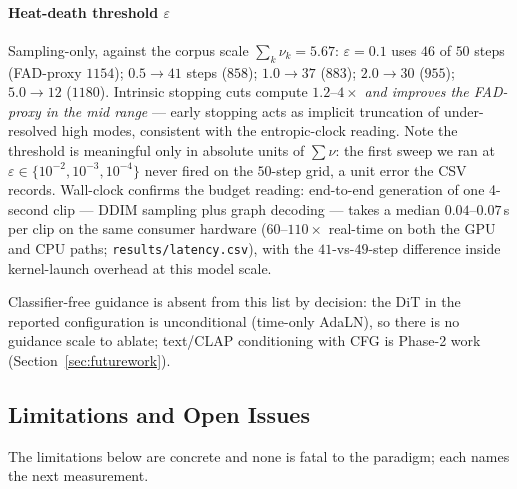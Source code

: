 \documentclass[12pt,a4paper]{article}
\begin{document}
\paragraph{Heat-death threshold $\varepsilon$}
Sampling-only, against the corpus scale $\sum_k \nu_k = 5.67$:
$\varepsilon = 0.1$ uses $46$ of $50$ steps (FAD-proxy $1154$);
$0.5 \to 41$ steps ($858$); $1.0 \to 37$ ($883$); $2.0 \to 30$ ($955$);
$5.0 \to 12$ ($1180$). Intrinsic stopping cuts compute $1.2$--$4\times$
\emph{and improves the FAD-proxy in the mid range} — early stopping acts
as implicit truncation of under-resolved high modes, consistent with
the entropic-clock reading. Note the threshold is meaningful only in
    absolute units of $\sum\nu$: the first sweep we ran at
    $\varepsilon \in \{10^{-2},10^{-3},10^{-4}\}$ never fired on the
    $50$-step grid, a unit error the CSV records. Wall-clock confirms
    the budget reading: end-to-end generation of one 4-second clip —
    DDIM sampling plus graph decoding — takes a median $0.04$–$0.07$\,s
    per clip on the same consumer hardware ($60$–$110\times$ real-time
    on both the GPU and CPU paths; \texttt{results/latency.csv}), with
    the $41$-vs-$49$-step difference inside kernel-launch overhead at
    this model scale.

Classifier-free guidance is absent from this list by decision: the DiT
in the reported configuration is unconditional (time-only AdaLN), so
there is no guidance scale to ablate; text/CLAP conditioning with CFG
is Phase-2 work (Section~\ref{sec:futurework}).

\subsection{Limitations and Open Issues}
\label{subsec:eval_limitations}

The limitations below are concrete and none is fatal to the paradigm;
each names the next measurement.
\end{document}
